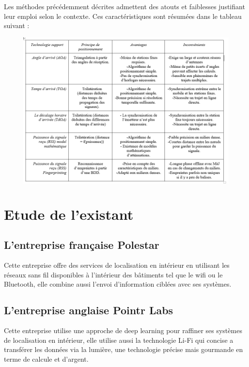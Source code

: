 \documentclass[12pt,a4paper]{report}
\begin{document}
\begin{itemize}
Les méthodes précédemment décrites admettent des atouts et faiblesses justifiant leur emploi selon le contexte. Ces caractéristiques sont résumées dans le tableau suivant :

  \begin{figure}[H]
 	\centering
 	\includegraphics[width=1.1\linewidth]{Pics/tableau.PNG}
 
 	
 	
 \end{figure}
\end{itemize}

\section{Etude de l’existant }
\subsection{L’entreprise française Polestar}
Cette entreprise offre des services de localisation en intérieur en utilisant les réseaux sans fil disponibles à l’intérieur des bâtiments tel que le wifi ou le Bluetooth, elle combine aussi l’envoi d’information ciblées avec ses systèmes.

\subsection{L’entreprise anglaise Pointr Labs}
Cette entreprise utilise une approche de deep learning pour raffiner ses systèmes de localisation en intérieur, elle utilise aussi la technologie Li-Fi qui concise a transférer les données via la lumière, une technologie précise mais gourmande en terme de calcule et d’argent.
\end{document}
